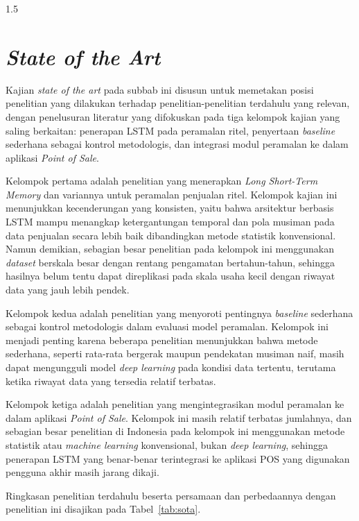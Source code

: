 \documentclass[12pt, a4paper, onecolumn, oneside]{report}
\begin{document}
\begin{spacing}{1.5}
\section{\textit{State of the Art}}

Kajian \textit{state of the art} pada subbab ini disusun untuk memetakan posisi penelitian yang dilakukan terhadap penelitian-penelitian terdahulu yang relevan, dengan penelusuran literatur yang difokuskan pada tiga kelompok kajian yang saling berkaitan: penerapan LSTM pada peramalan ritel, penyertaan \textit{baseline} sederhana sebagai kontrol metodologis, dan integrasi modul peramalan ke dalam aplikasi \textit{Point of Sale}.

Kelompok pertama adalah penelitian yang menerapkan \textit{Long Short-Term Memory} dan variannya untuk peramalan penjualan ritel. Kelompok kajian ini menunjukkan kecenderungan yang konsisten, yaitu bahwa arsitektur berbasis LSTM mampu menangkap ketergantungan temporal dan pola musiman pada data penjualan secara lebih baik dibandingkan metode statistik konvensional. Namun demikian, sebagian besar penelitian pada kelompok ini menggunakan \textit{dataset} berskala besar dengan rentang pengamatan bertahun-tahun, sehingga hasilnya belum tentu dapat direplikasi pada skala usaha kecil dengan riwayat data yang jauh lebih pendek.

Kelompok kedua adalah penelitian yang menyoroti pentingnya \textit{baseline} sederhana sebagai kontrol metodologis dalam evaluasi model peramalan. Kelompok ini menjadi penting karena beberapa penelitian menunjukkan bahwa metode sederhana, seperti rata-rata bergerak maupun pendekatan musiman naif, masih dapat mengungguli model \textit{deep learning} pada kondisi data tertentu, terutama ketika riwayat data yang tersedia relatif terbatas.

Kelompok ketiga adalah penelitian yang mengintegrasikan modul peramalan ke dalam aplikasi \textit{Point of Sale}. Kelompok ini masih relatif terbatas jumlahnya, dan sebagian besar penelitian di Indonesia pada kelompok ini menggunakan metode statistik atau \textit{machine learning} konvensional, bukan \textit{deep learning}, sehingga penerapan LSTM yang benar-benar terintegrasi ke aplikasi POS yang digunakan pengguna akhir masih jarang dikaji.

Ringkasan penelitian terdahulu beserta persamaan dan perbedaannya dengan penelitian ini disajikan pada Tabel~\ref{tab:sota}.

\begin{landscape}
\setlength{\tabcolsep}{3pt}
{\small{}
\begin{longtable}{|>{\centering\arraybackslash}p{0.7cm}|>{\raggedright\arraybackslash}p{2.9cm}|>{\raggedright\arraybackslash}p{3.7cm}|>{\raggedright\arraybackslash}p{3.1cm}|>{\raggedright\arraybackslash}p{3.4cm}|>{\raggedright\arraybackslash}p{3.2cm}|>{\raggedright\arraybackslash}p{3.5cm}|}


\end{longtable}}
\end{landscape}
\end{spacing}
\end{document}
